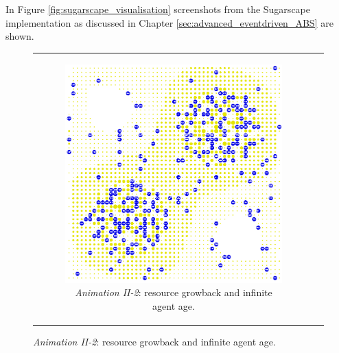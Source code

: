 In Figure \ref{fig:sugarscape_visualisation} screenshots from the Sugarscape implementation as discussed in Chapter \ref{sec:advanced_eventdriven_ABS} are shown.


\begin{figure}[H]
\begin{center}
	\begin{tabular}{c c}
		\begin{subfigure}[b]{0.4\textwidth}
			\centering
			\includegraphics[width=1\textwidth, angle=0]{./fig/background/abs/sugarscape_normal.png}
			\caption{\textit{Animation II-2}: resource growback and infinite agent age.}
			\label{fig:sugarscape_visualisation_normal}
		\end{subfigure}
		
		&
    	

\end{tabular}
\end{center}
\end{figure}

